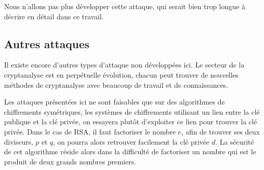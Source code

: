 Nous n'allons pas plus développer cette attaque, qui serait bien
trop longue à décrire en détail dans ce travail.


\subsection{Autres attaques}
Il existe encore d'autres types d'attaque non développées ici. Le
secteur de la cryptanalyse est en perpétuelle évolution, chacun
peut trouver de nouvelles méthodes de cryptanalyse avec beaucoup
de travail et de connaissances.

Les attaques présentées ici ne sont faisables que sur des
algorithmes de chiffrements symétriques, les systèmes de
chiffrements utilisant un lien entre la clé publique et la clé
privée, on essayera plutôt d'exploiter ce lien pour trouver la
clé privée. Dans le cas de RSA, il faut factoriser le nombre $e$,
afin de trouver ses deux diviseurs, $p$ et $q$, on pourra alors
retrouver facilement la clé privée $d$. La sécurité de cet
algorithme réside alors dans la difficulté de factoriser un nombre
qui est le produit de deux grands nombres premiers.

